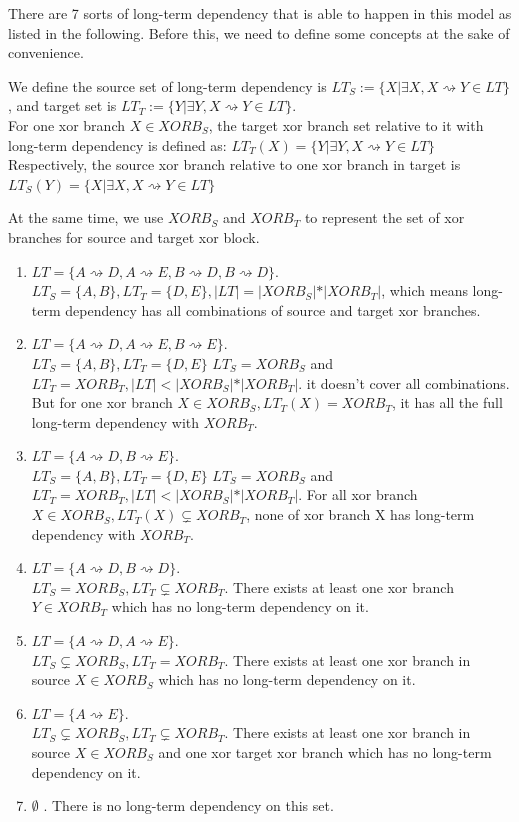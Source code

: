 There are 7 sorts of long-term dependency that is able to happen in this model as listed in the following. Before this, we need to define some concepts at the sake of convenience.
\begin{definition}
	We define the source set of long-term dependency is  $LT_S:= \{X \vert \exists X, X\rightsquigarrow Y  \in LT \} $, and target set is $LT_T:= \{Y \vert \exists Y, X\rightsquigarrow Y \in LT \} $. \\
	For one xor branch $X \in XORB_S$, the target xor branch set relative to it with long-term dependency is defined as:
	$ LT_T(X)= \{Y \vert \exists Y, X\rightsquigarrow Y \in LT \}$
	Respectively, the source xor branch relative to one xor branch in target is
	$ LT_S(Y)= \{X \vert \exists X, X\rightsquigarrow Y \in LT \}$
\end{definition}
At the same time, we use $XORB_S $ and $XORB_T$ to represent the set of xor branches for source and target xor block. 
\begin{enumerate}
	\item $LT=\{ A\rightsquigarrow D, A\rightsquigarrow E, B\rightsquigarrow D, B\rightsquigarrow D\}$. \\
	$LT_S = \{A,B\}, LT_T=\{D,E\}, \vert LT \vert = \vert XORB_S \vert * \vert XORB_T \vert  $, which means long-term dependency has all combinations of source and target xor branches. 
	\item $LT=\{ A\rightsquigarrow D, A\rightsquigarrow E, B\rightsquigarrow E\}. $\\
	$LT_S = \{A,B\}, LT_T=\{D,E\}$
	$LT_S = XORB_S $ and $LT_T = XORB_T, \vert LT \vert < \vert XORB_S \vert * \vert XORB_T \vert $. it doesn't cover all combinations. But for one xor branch $X \in XORB_S, LT_T(X)= XORB_T$, it has all the full long-term dependency with $XORB_T$. 
	\item $LT=\{ A\rightsquigarrow D, B\rightsquigarrow E\}. $\\
	$LT_S = \{A,B\}, LT_T=\{D,E\}$
	$LT_S = XORB_S $ and $LT_T = XORB_T, \vert LT \vert < \vert XORB_S \vert * \vert XORB_T \vert $. For all xor branch $X \in XORB_S, LT_T(X) \subsetneq XORB_T$, none of xor branch X has long-term dependency with $XORB_T$.
	\item $LT=\{ A\rightsquigarrow D, B\rightsquigarrow D\}.$ \\
	$LT_S = XORB_S ,  LT_T \subsetneq XORB_T$. There exists at least one xor branch $Y \in XORB_T$ which has no long-term dependency on it.
	\item $LT=\{ A\rightsquigarrow D, A\rightsquigarrow E\}.$ \\
	$LT_S \subsetneq XORB_S ,  LT_T = XORB_T$.
	There exists at least one xor branch in source $X \in XORB_S$ which has no long-term dependency on it.
	\item $LT=\{ A\rightsquigarrow E\}. $\\
	$LT_S \subsetneq XORB_S ,  LT_T \subsetneq XORB_T$.
	There exists at least one xor branch in source $X \in XORB_S$  and one xor target xor branch which has no long-term dependency on it.
	\item $ \emptyset$ . There is no long-term dependency on this set. 
\end{enumerate}
